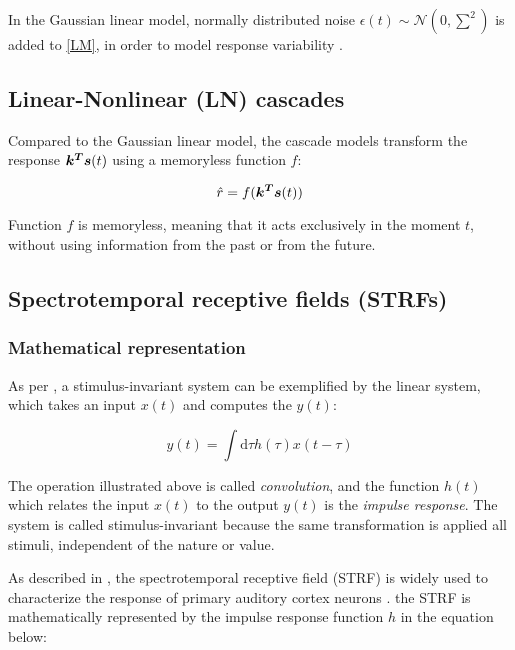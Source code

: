 In the Gaussian linear model, normally distributed noise $\epsilon(t) \sim \mathcal{N}(0, \sum^2)$ is added to \eqref{LM}, in order to model response variability \parencite{meyerModelsNeuronalStimulusResponse2017}.

\subsection{Linear-Nonlinear (LN) cascades}

Compared to the Gaussian linear model, the cascade models transform the response $\bm{k^T}\bm{s}(t)$ using a memoryless function $f$:

\begin{equation}
	\hat{r} = f(\bm{k^T}\bm{s}(t))
\end{equation}

Function $f$ is memoryless, meaning that it acts exclusively in the moment $t$, without using information from the past or from the future.

\subsection{Spectrotemporal receptive fields (STRFs)}

\subsubsection{Mathematical representation}

As per \textcite{aertsenSpectroTemporalReceptiveField1981}, a stimulus-invariant system can be exemplified by the linear system, which takes an input $x(t)$ and computes the $y(t)$:

\begin{equation}
	y(t) = \int \mathrm{d}\tau h(\tau) x(t - \tau)
\end{equation}

The operation illustrated above is called \emph{convolution}, and the function $h(t)$ which relates the input $x(t)$ to the output $y(t)$ is the \emph{impulse response}. The system is called stimulus-invariant because the same transformation is applied all stimuli, independent of the nature or value.

As described in \textcite{aertsenSpectrotemporalReceptiveFields1980}, the spectrotemporal receptive field (STRF) is widely used to characterize the response of primary auditory cortex neurons \parencite{ahrensNonlinearitiesContextualInfluences2008}. the STRF is mathematically represented by the impulse response function $h$ in the equation below:

